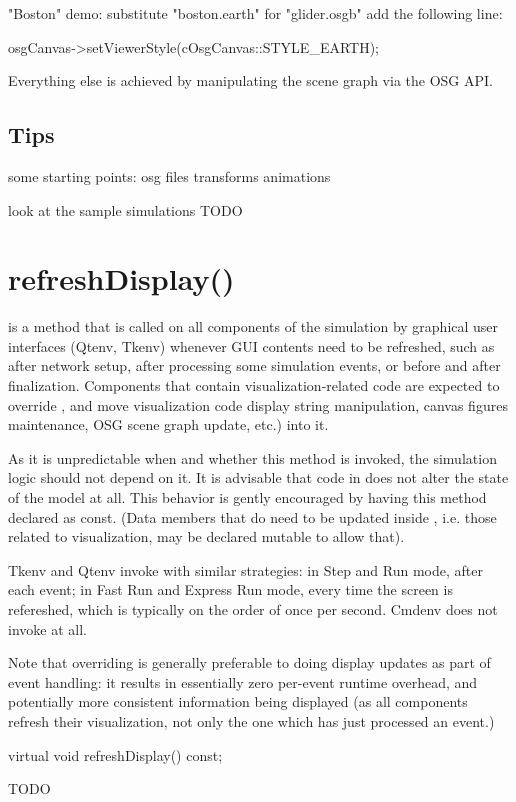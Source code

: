 "Boston" demo:
 substitute "boston.earth" for "glider.osgb"
 add the following line:

\begin{cpp}
osgCanvas->setViewerStyle(cOsgCanvas::STYLE_EARTH);
\end{cpp}

Everything else is achieved by manipulating the scene graph via the OSG API.

\subsection{Tips}

some starting points:
osg files
transforms
animations

look at the sample simulations
TODO


\section{refreshDisplay()}
\label{sec:ch-graphics:refreshdisplay}

 is a method that is called on all components of
the simulation by graphical user interfaces (Qtenv, Tkenv) whenever GUI
contents need to be refreshed, such as after network setup, after
processing some simulation events, or before and after finalization.
Components that contain visualization-related code are expected to override
, and move visualization code display string
manipulation, canvas figures maintenance, OSG scene graph update, etc.)
into it.

As it is unpredictable when and whether this method is invoked, the
simulation logic should not depend on it. It is advisable that code in
 does not alter the state of the model at all. This
behavior is gently encouraged by having this method declared as const.
(Data members that do need to be updated inside , i.e.
those related to visualization, may be declared mutable to allow that).

Tkenv and Qtenv invoke  with similar strategies: in Step
and Run mode, after each event; in Fast Run and Express Run mode, every
time the screen is refereshed, which is typically on the order of once
per second. Cmdenv does not invoke  at all.

Note that overriding  is generally preferable to doing
display updates as part of event handling: it results in essentially
zero per-event runtime overhead, and potentially more consistent
information being displayed (as all components refresh their visualization,
not only the one which has just processed an event.)

\begin{cpp}
virtual void refreshDisplay() const;
\end{cpp}


TODO


